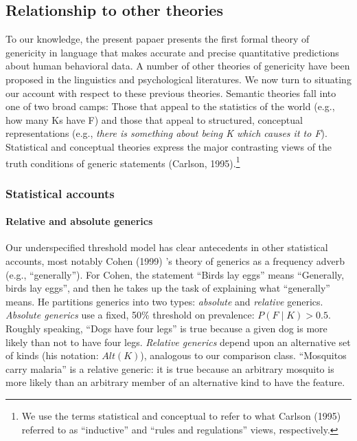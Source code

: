 \documentclass[english,floatsintext,man]{apa6}
\theoremstyle{definition}
\theoremstyle{definition}
\theoremstyle{definition}
\theoremstyle{remark}
\begin{document}
\subsection{Relationship to other
theories}\label{relationship-to-other-theories}

To our knowledge, the present papaer presents the first formal theory of
genericity in language that makes accurate and precise quantitative
predictions about human behavioral data. A number of other theories of
genericity have been proposed in the linguistics and psychological
literatures. We now turn to situating our account with respect to these
previous theories. Semantic theories fall into one of two broad camps:
Those that appeal to the statistics of the world (e.g., how many Ks have
F) and those that appeal to structured, conceptual representations
(e.g., \emph{there is something about being K which causes it to F}).
Statistical and conceptual theories express the major contrasting views
of the truth conditions of generic statements (Carlson, 1995).\footnote{We
  use the terms statistical and conceptual to refer to what Carlson
  (1995) referred to as \enquote{inductive} and \enquote{rules and
  regulations} views, respectively.}

\subsubsection{Statistical accounts}\label{statistical-accounts}

\paragraph{Relative and absolute
generics}\label{relative-and-absolute-generics}

Our underspecified threshold model has clear antecedents in other
statistical accounts, most notably Cohen (1999) 's theory of generics as
a frequency adverb (e.g., \enquote{generally}). For Cohen, the statement
\enquote{Birds lay eggs} means \enquote{Generally, birds lay eggs}, and
then he takes up the task of explaining what \enquote{generally} means.
He partitions generics into two types: \emph{absolute} and
\emph{relative} generics. \emph{Absolute generics} use a fixed, 50\%
threshold on prevalence: \(P(F\mid K)>0.5\). Roughly speaking,
\enquote{Dogs have four legs} is true because a given dog is more likely
than not to have four legs. \emph{Relative generics} depend upon an
alternative set of kinds (his notation: \(Alt(K)\)), analogous to our
comparison class. \enquote{Mosquitos carry malaria} is a relative
generic: it is true because an arbitrary mosquito is more likely than an
arbitrary member of an alternative kind to have the feature.
\end{document}
